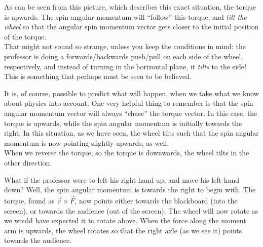 \begin{figure}[H]
\begin{subfigure}[b]{0.4\textwidth}
\end{subfigure}
\end{figure}


As can be seen from this picture, which describes this exact situation, the torque is upwards. The spin angular momentum will ``follow'' this torque, and \emph{tilt the wheel} so that the angular spin momentum vector gets closer to the initial position of the torque.\\
That might not sound so strange, unless you keep the conditions in mind: the professor is doing a forwards/backwards push/pull on each side of the wheel, respectively, and instead of turning in the horizontal plane, it \emph{tilts} to the side! This is something that perhaps must be seen to be believed.

It is, of course, possible to predict what will happen, when we take what we know about physics into account. One very helpful thing to remember is that the spin angular momentum vector will always ``chase'' the torque vector. In this case, the torque is upwards, while the spin angular momentum is initially towards the right. In this situation, as we have seen, the wheel tilts such that the spin angular momentum is now pointing slightly upwards, as well.\\
When we reverse the torque, so the torque is downwards, the wheel tilts in the other direction.

What if the professor were to left his right hand up, and move his left hand down? Well, the spin angular momentum is towards the right to begin with. The torque, found as $\vec{r} \times \vec{F}$, now points either towards the blackboard (into the screen), or towards the audience (out of the screen). The wheel will now rotate as we would have expected it to rotate above. When the force along the moment arm is upwards, the wheel rotates so that the right axle (as we see it) points towards the audience.

